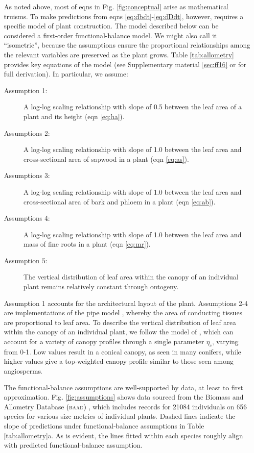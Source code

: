 \documentclass[a4paper,11pt]{article}
\begin{document}
As noted above, most of eqns in Fig. \ref{fig:conceptual} arise as mathematical truisms. To make predictions from eqns \ref{eq:dbdt}-\ref{eq:dDdt}, however, requires a specific model of plant construction. The model described below can be considered a first-order functional-balance model. We might also call it ``isometric'', because the assumptions ensure the proportional relationships among the relevant variables are preserved as the plant grows. Table \ref{tab:allometry} provides key equations of the model (see Supplementary material \ref{sec:ff16} or \citet{Falster-2016} for full derivation). In particular, we assume:
\begin{description}
\item[Assumption 1:] A log-log scaling relationship with slope of 0.5 between the leaf area of a plant and its height (eqn \ref{eq:ha}).
\item[Assumptions 2:] A log-log scaling relationship with slope of 1.0 between the leaf area and cross-sectional area of sapwood in a plant (eqn \ref{eq:as}).
\item[Assumptions 3:] A log-log scaling relationship with slope of 1.0 between the leaf area and cross-sectional area of bark and phloem in a plant (eqn \ref{eq:ab}).
\item[Assumptions 4:] A log-log scaling relationship with slope of 1.0 between the leaf area and mass of fine roots in a plant (eqn \ref{eq:mr}).
\item[Assumption 5:] The vertical distribution of leaf area within the canopy of an individual plant remains relatively constant through ontogeny.
\end{description}

Assumption 1 accounts for the architectural layout of the plant. Assumptions 2-4 are implementations of the pipe model \citep{Shinozaki-1964}, whereby the area of conducting tissues are proportional to leaf area. To describe the vertical distribution of leaf area within the canopy of an individual plant, we follow the model of \citet{Yokozawa-1995}, which can account for a variety of canopy profiles through a single parameter $\eta_c$, varying from 0-1. Low values result in a conical canopy, as seen in many conifers, while higher values give a top-weighted canopy profile similar to those seen among angiosperms.

The functional-balance assumptions are well-supported by data, at least to first approximation. Fig. \ref{fig:assumptions} shows data sourced from the Biomass and Allometry Database (\textsc{baad}) \citep{Falster-2015b}, which includes records for 21084 individuals on 656 species for various size metrics of individual plants. Dashed lines indicate the slope of predictions under functional-balance assumptions in Table \ref{tab:allometry}a. As is evident, the lines fitted within each species roughly align with predicted functional-balance assumption.
\end{document}
